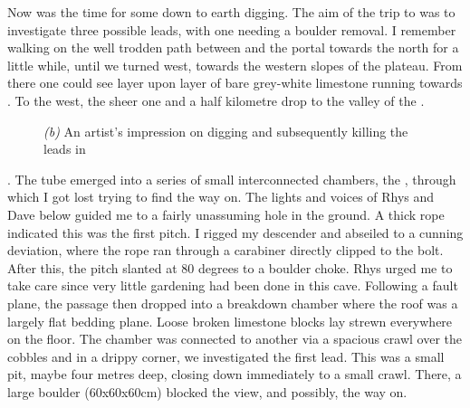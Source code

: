 	Now was the time for some down to earth digging. The aim of the trip to  was to investigate three possible leads, with one needing a boulder removal. I remember walking on the well trodden path between  and the portal towards the north for a little while, until we turned west, towards the western slopes of the plateau. From there one could see layer upon layer of bare grey-white limestone running towards . To the west, the sheer one and a half kilometre drop to the valley of the .

	\begin{figure}[t!]
		\checkoddpage \ifoddpage \forcerectofloat \else \forceversofloat \fi
		\centering



		\begin{subfigure}{\textwidth}
			\centering
			\caption{}\label{}
		\end{subfigure}
	\caption{
		\emph{(b)} An artist's impression on digging and subsequently killing the leads in  
		}
	
	\end{figure}

	. The tube emerged into a series of small interconnected chambers, the , through which I got lost trying to find the way on. The lights and voices of Rhys and Dave below guided me to a fairly unassuming hole in the ground. A thick rope indicated this was the first pitch. I rigged my descender and abseiled to a cunning deviation, where the rope ran through a carabiner directly clipped to the bolt. After this, the pitch slanted at 80 degrees to a boulder choke. Rhys urged me to take care since very little gardening had been done in this cave. Following a fault plane, the passage then dropped into a breakdown chamber where the roof was a largely flat bedding plane. Loose broken limestone blocks lay strewn everywhere on the floor. The chamber was connected to another via a spacious crawl over the cobbles and in a drippy corner, we investigated the first lead. This was a small pit, maybe four metres deep, closing down immediately to a small crawl. There, a large boulder (60x60x60cm) blocked the view, and possibly, the way on.

